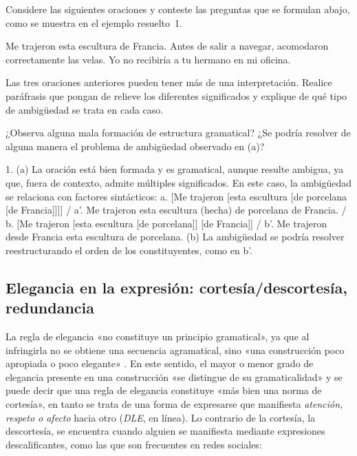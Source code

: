 \begin{ejercicio}\label{ej:02-ambiguedad}
Considere las siguientes oraciones y conteste las preguntas que se formulan
abajo, como se muestra en el ejemplo resuelto~1.

\begin{exe}
  \ex Me trajeron esta escultura de Francia.
  \ex Antes de salir a navegar, acomodaron correctamente las velas.
  \ex Yo no recibiría a tu hermano en mi oficina.
\end{exe}

\begin{consignas}
  \item Las tres oraciones anteriores pueden tener más de una interpretación.
        Realice paráfrasis que pongan de relieve los diferentes significados y
        explique de qué tipo de ambigüedad se trata en cada caso.
  \item ¿Observa alguna mala formación de estructura gramatical? ¿Se podría
        resolver de alguna manera el problema de ambigüedad observado en (a)?
\end{consignas}

\begin{resuelto}
1. (a) La oración está bien formada y es gramatical, aunque resulte ambigua, ya
que, fuera de contexto, admite múltiples significados. En este caso, la
ambigüedad se relaciona con factores sintácticos: a. [Me trajeron [esta
escultura [de porcelana [de Francia]]]] / a'. Me trajeron esta escultura
(hecha) de porcelana de Francia. / b. [Me trajeron [esta escultura [de
porcelana]] [de Francia]] / b'. Me trajeron desde Francia esta escultura de
porcelana. (b) La ambigüedad se podría resolver reestructurando el orden de los
constituyentes, como en b'.
\end{resuelto}
\end{ejercicio}

\subsection{Elegancia en la expresión: cortesía/descortesía, redundancia}

La regla de elegancia «no constituye un principio gramatical», ya que al
infringirla no se obtiene una secuencia agramatical, sino «una construcción poco
apropiada o poco elegante» \parencite[36]{bosque2009}. En este sentido, el mayor
o menor grado de elegancia presente en una construcción «se distingue de su
gramaticalidad» y se puede decir que una regla de elegancia constituye «más
bien una norma de cortesía», en tanto se trata de una forma de expresarse que
manifiesta \textit{atención, respeto o afecto} hacia otro (\textit{DLE}, en
línea). Lo contrario de la cortesía, la descortesía, se encuentra cuando alguien
se manifiesta mediante expresiones descalificantes, como las que son frecuentes
en redes sociales:


